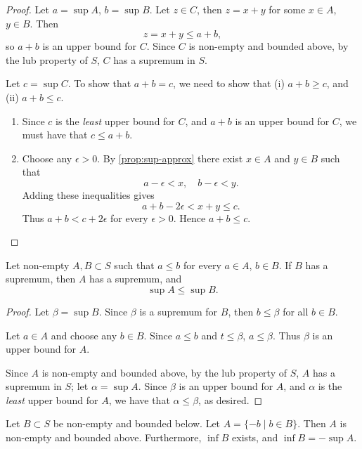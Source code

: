 \begin{proof}
Let $a=\sup A$, $b=\sup B$. Let $z\in C$, then $z=x+y$ for some $x\in A$, $y\in B$. Then
\[z=x+y\le a+b,\]
so $a+b$ is an upper bound for $C$. Since $C$ is non-empty and bounded above, by the lub property of $S$, $C$ has a supremum in $S$. 

Let $c=\sup C$. To show that $a+b=c$, we need to show that (i) $a+b\ge c$, and (ii) $a+b\le c$.
\begin{enumerate}[label=(\roman*)]
\item Since $c$ is the \emph{least} upper bound for $C$, and $a+b$ is an upper bound for $C$, we must have that $c\le a+b$.
\item Choose any $\epsilon>0$. By \cref{prop:sup-approx} there exist $x\in A$ and $y\in B$ such that
\[a-\epsilon<x,\quad b-\epsilon<y.\]
Adding these inequalities gives
\[a+b-2\epsilon<x+y\le c.\]
Thus $a+b<c+2\epsilon$ for every $\epsilon>0$. Hence $a+b\le c$.
\end{enumerate}
\end{proof}

\begin{proposition}
Let non-empty $A,B\subset S$ such that $a\le b$ for every $a\in A$, $b\in B$. If $B$ has a supremum, then $A$ has a supremum, and
\[\sup A\le\sup B.\]
\end{proposition}

\begin{proof}
Let $\beta=\sup B$. Since $\beta$ is a supremum for $B$, then $b\le\beta$ for all $b\in B$.

Let $a\in A$ and choose any $b \in B$. Since $a \le b$ and $t \le \beta$, $a\le\beta$. Thus $\beta$ is an upper bound for $A$.

Since $A$ is non-empty and bounded above, by the lub property of $S$, $A$ has a supremum in $S$; let $\alpha=\sup A$. Since $\beta$ is an upper bound for $A$, and $\alpha$ is the \emph{least} upper bound for $A$, we have that $\alpha\le\beta$, as desired.
\end{proof}

\begin{proposition}
Let $B \subset S$ be non-empty and bounded below. Let $A = \{-b \mid b \in B\}$. Then $A$ is non-empty and bounded above. Furthermore, $\inf B$ exists, and $\inf B=-\sup A$.
\end{proposition}

